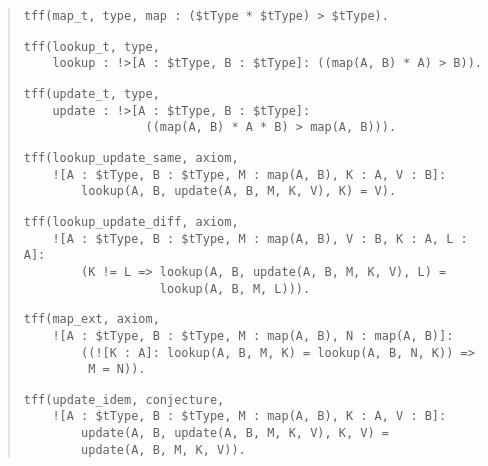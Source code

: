 \begin{quote}
\verb+tff(map_t, type, map : ($tType * $tType) > $tType).+
\par\smallskip
\verb+tff(lookup_t, type,+\\
\verb+    lookup : !>[A : $tType, B : $tType]: ((map(A, B) * A) > B)).+\kern-10mm
\par\smallskip
\verb+tff(update_t, type,+\\
\verb+    update : !>[A : $tType, B : $tType]:+\\
\verb+                 ((map(A, B) * A * B) > map(A, B))).+
\par\medskip\smallskip %
\verb+tff(lookup_update_same, axiom,+\\
\verb+    ![A : $tType, B : $tType, M : map(A, B), K : A, V : B]:+\\
\verb+        lookup(A, B, update(A, B, M, K, V), K) = V).+
\par\smallskip
\verb+tff(lookup_update_diff, axiom,+\\
\verb+    ![A : $tType, B : $tType, M : map(A, B), V : B, K : A, L : A]:+\kern-10mm\\
\verb+        (K != L => lookup(A, B, update(A, B, M, K, V), L) =+\\
\verb+                   lookup(A, B, M, L))).+
\par\smallskip
\verb+tff(map_ext, axiom,+\\
\verb+    ![A : $tType, B : $tType, M : map(A, B), N : map(A, B)]:+\\
\verb+        ((![K : A]: lookup(A, B, M, K) = lookup(A, B, N, K)) =>+\kern-10mm\\
\verb+         M = N)).+
\par\medskip\smallskip %
\verb+tff(update_idem, conjecture,+\\
\verb+    ![A : $tType, B : $tType, M : map(A, B), K : A, V : B]:+\\
\verb+        update(A, B, update(A, B, M, K, V), K, V) =+\\
\verb+        update(A, B, M, K, V)).+
\end{quote}
